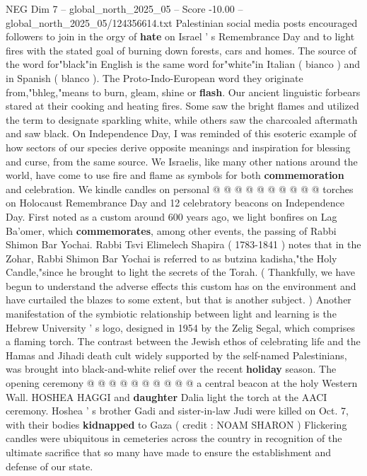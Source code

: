 \begin{textsample}{NEG Dim 7 – global\_north\_2025\_05 – Score -10.00 – global\_north\_2025\_05/124356614.txt}  \label{ex:f7_neg_102}
Palestinian social media posts encouraged followers to join in the orgy of \textbf{hate} on Israel ' s Remembrance Day and to light fires with the stated goal of burning down forests, cars and homes.
The source of the word for"black"in English is the same word for"white"in Italian ( bianco ) and in Spanish ( blanco ).
The Proto-Indo-European word they originate from,"bhleg,"means to burn, gleam, shine or \textbf{flash}.
Our ancient linguistic forbears stared at their cooking and heating fires.
Some saw the bright flames and utilized the term to designate sparkling white, while others saw the charcoaled aftermath and saw black.
On Independence Day, I was reminded of this esoteric example of how sectors of our species derive opposite meanings and inspiration for blessing and curse, from the same source.
We Israelis, like many other nations around the world, have come to use fire and flame as symbols for both \textbf{commemoration} and celebration.
We kindle candles on personal @ @ @ @ @ @ @ @ @ @ torches on Holocaust Remembrance Day and 12 celebratory beacons on Independence Day.
First noted as a custom around 600 years ago, we light bonfires on Lag Ba'omer, which \textbf{commemorates}, among other events, the passing of Rabbi Shimon Bar Yochai.
Rabbi Tsvi Elimelech Shapira ( 1783-1841 ) notes that in the Zohar, Rabbi Shimon Bar Yochai is referred to as butzina kadisha,"the Holy Candle,"since he brought to light the secrets of the Torah. ( Thankfully, we have begun to understand the adverse effects this custom has on the environment and have curtailed the blazes to some extent, but that is another subject. ) Another manifestation of the symbiotic relationship between light and learning is the Hebrew University ' s logo, designed in 1954 by the Zelig Segal, which comprises a flaming torch.
The contrast between the Jewish ethos of celebrating life and the Hamas and Jihadi death cult widely supported by the self-named Palestinians, was brought into black-and-white relief over the recent \textbf{holiday} season.
The opening ceremony @ @ @ @ @ @ @ @ @ @ a central beacon at the holy Western Wall.
HOSHEA HAGGI and \textbf{daughter} Dalia light the torch at the AACI ceremony.
Hoshea ' s brother Gadi and sister-in-law Judi were killed on Oct. 7, with their bodies \textbf{kidnapped} to Gaza ( credit : NOAM SHARON ) Flickering candles were ubiquitous in cemeteries across the country in recognition of the ultimate sacrifice that so many have made to ensure the establishment and defense of our state.

\end{textsample}
